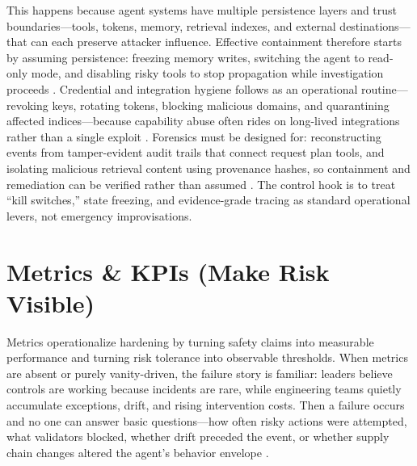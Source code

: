 \begin{TNtwocol}
  This happens because agent systems have multiple persistence layers and trust boundaries—tools, tokens, memory, retrieval indexes, and external destinations—that can each preserve attacker influence. Effective containment therefore starts by assuming persistence: freezing memory writes, switching the agent to read-only mode, and disabling risky tools to stop propagation while investigation proceeds \cite{cisa-ztmm-v2,owasp-top10-llm-2025}. Credential and integration hygiene follows as an operational routine—revoking keys, rotating tokens, blocking malicious domains, and quarantining affected indices—because capability abuse often rides on long-lived integrations rather than a single exploit \cite{nist-sp800-207,nist-sp800-53b}. Forensics must be designed for: reconstructing events from tamper-evident audit trails that connect request  \rightarrow  plan  \rightarrow  tools, and isolating malicious retrieval content using provenance hashes, so containment and remediation can be verified rather than assumed \cite{nist-sp800-53b,cisa-ztmm-v2}. The control hook is to treat “kill switches,” state freezing, and evidence-grade tracing as standard operational levers, not emergency improvisations.

  \section{Metrics \& KPIs (Make Risk Visible)}

  Metrics operationalize hardening by turning safety claims into measurable performance and turning risk tolerance into observable thresholds. When metrics are absent or purely vanity-driven, the failure story is familiar: leaders believe controls are working because incidents are rare, while engineering teams quietly accumulate exceptions, drift, and rising intervention costs. Then a failure occurs and no one can answer basic questions—how often risky actions were attempted, what validators blocked, whether drift preceded the event, or whether supply chain changes altered the agent's behavior envelope \cite{owasp-top10-llm-2025,nist-sp800-53b}.


\end{TNtwocol}
